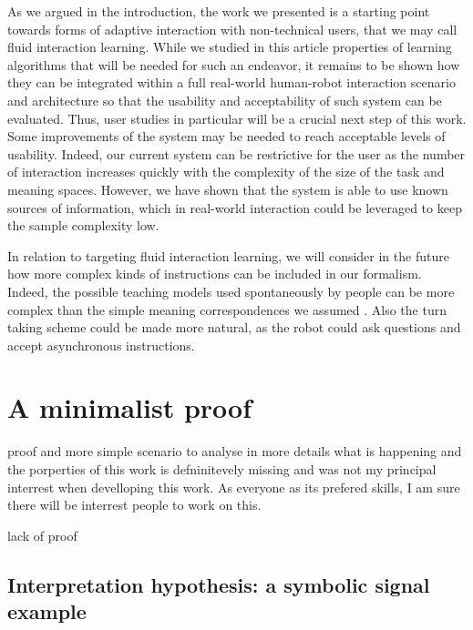 As we argued in the introduction, the work we presented is a starting point towards forms of adaptive interaction with non-technical users, that we may call fluid interaction learning. While we studied in this article properties of learning algorithms that will be needed for such an endeavor, it remains to be shown how they can be integrated within a full real-world human-robot interaction scenario and architecture so that the usability and acceptability of such system can be evaluated. Thus, user studies in particular will be a crucial next step of this work. Some improvements of the system may be needed to reach acceptable levels of usability.
Indeed, our current system can be restrictive for the user as the number of interaction increases quickly with the complexity of the size of the task and meaning spaces. However, we have shown that the system is able to use known sources of information, which in real-world interaction could be leveraged to keep the sample complexity low.

In relation to targeting fluid interaction learning, we will consider in the future how more complex kinds of instructions can be included in our formalism. Indeed, the possible teaching models used spontaneously by people can be more complex than the simple meaning correspondences we assumed \cite{thomaz2008teachable,Cakmak2010optimality}. Also the turn taking scheme could be made more natural, as the robot could ask questions \cite{cakmak2012designing} and accept asynchronous instructions.


\section{A minimalist proof}

proof and more simple scenario to analyse in more details what is happening and the porperties of this work is defninitevely missing and was not my principal interrest when develloping this work. As everyone as its prefered skills, I am sure there will be interrest people to work on this.

lack of proof

\subsection{Interpretation hypothesis: a symbolic signal example}

